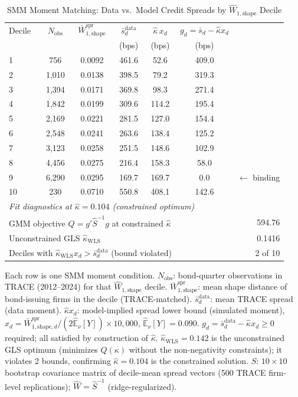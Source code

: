\begin{table}[htbp]
\centering
\caption{SMM Moment Matching: Data vs.\ Model Credit Spreads by $\widehat{W}_{1,\text{shape}}$ Decile}
\label{tab:moment_matching}
\begin{threeparttable}
\begin{tabular}{lcccccl}
\toprule
Decile & $N_{\text{obs}}$ & $\bar{W}_{1,\text{shape}}^{\text{spr}}$ & $\bar{s}_d^{\text{data}}$ & $\hat\kappa\,x_d$ & $g_d = \bar{s}_d - \hat\kappa x_d$ & \\
& & & (bps) & (bps) & (bps) & \\
\midrule
  1 & 756 & 0.0092 & 461.6 & 52.6 & 409.0 & \\
  2 & 1,010 & 0.0138 & 398.5 & 79.2 & 319.3 & \\
  3 & 1,394 & 0.0171 & 369.8 & 98.3 & 271.4 & \\
  4 & 1,842 & 0.0199 & 309.6 & 114.2 & 195.4 & \\
  5 & 2,169 & 0.0221 & 281.5 & 127.0 & 154.4 & \\
  6 & 2,548 & 0.0241 & 263.6 & 138.4 & 125.2 & \\
  7 & 3,123 & 0.0258 & 251.5 & 148.6 & 102.9 & \\
  8 & 4,456 & 0.0275 & 216.4 & 158.3 & 58.0 & \\
  9 & 6,290 & 0.0295 & 169.7 & 169.7 & 0.0 & $\leftarrow$ binding \\
  10 & 230 & 0.0710 & 550.8 & 408.1 & 142.6 & \\
\midrule
\multicolumn{7}{l}{\textit{Fit diagnostics at $\hat\kappa = 0.104$ (constrained optimum)}} \\
\multicolumn{5}{l}{GMM objective $Q = g'\hat{S}^{-1}g$ at constrained $\hat\kappa$} & \multicolumn{2}{r}{594.76} \\
\multicolumn{5}{l}{Unconstrained GLS $\hat\kappa_{\text{WLS}}$} & \multicolumn{2}{r}{0.1416} \\
\multicolumn{5}{l}{Deciles with $\hat\kappa_{\text{WLS}} x_d > \bar s_d^{\text{data}}$ (bound violated)} & \multicolumn{2}{r}{2 of 10} \\
\bottomrule
\end{tabular}
\begin{tablenotes}
\small
\item Each row is one SMM moment condition. $N_{\text{obs}}$: bond-quarter observations in TRACE (2012--2024) for that $\widehat{W}_{1,\text{shape}}$ decile. $\bar{W}_{1,\text{shape}}^{\text{spr}}$: mean shape distance of bond-issuing firms in the decile (TRACE-matched). $\bar{s}_d^{\text{data}}$: mean TRACE spread (data moment). $\hat\kappa x_d$: model-implied spread lower bound (simulated moment), $x_d = \bar{W}_{1,\text{shape},d}^{\text{spr}}/(2\hat{\mathbb{E}}_\nu[Y])\times 10{,}000$, $\hat{\mathbb{E}}_\nu[Y] = 0.090$. $g_d = \bar{s}_d^{\text{data}} - \hat\kappa x_d \geq 0$ required; all satisfied by construction of $\hat\kappa$. $\hat\kappa_{\text{WLS}} = 0.142$ is the unconstrained GLS optimum (minimizes $Q(\kappa)$ without the non-negativity constraints); it violates 2 bounds, confirming $\hat\kappa = 0.104$ is the constrained solution. $\hat{S}$: $10\times10$ bootstrap covariance matrix of decile-mean spread vectors (500 TRACE firm-level replications); $\hat{W} = \hat{S}^{-1}$ (ridge-regularized).

\end{tablenotes}
\end{threeparttable}
\end{table}
